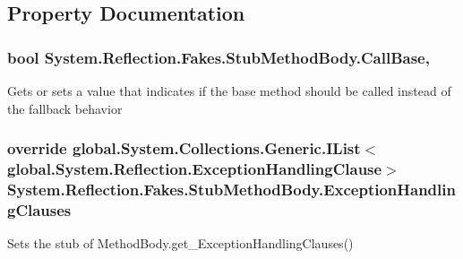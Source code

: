 \subsection{Property Documentation}
\hypertarget{class_system_1_1_reflection_1_1_fakes_1_1_stub_method_body_a09b0a63c100b8145706a73fa740afc9e}{
\subsubsection[{Call\-Base}]{\setlength{\rightskip}{0pt plus 5cm}bool System.\-Reflection.\-Fakes.\-Stub\-Method\-Body.\-Call\-Base\hspace{0.3cm}{\ttfamily [get]}, {\ttfamily [set]}}}\label{class_system_1_1_reflection_1_1_fakes_1_1_stub_method_body_a09b0a63c100b8145706a73fa740afc9e}


Gets or sets a value that indicates if the base method should be called instead of the fallback behavior

\hypertarget{class_system_1_1_reflection_1_1_fakes_1_1_stub_method_body_ac2cdb81048b3b44327038e964fe1f2de}{
\subsubsection[{Exception\-Handling\-Clauses}]{\setlength{\rightskip}{0pt plus 5cm}override global.\-System.\-Collections.\-Generic.\-I\-List$<$global.\-System.\-Reflection.\-Exception\-Handling\-Clause$>$ System.\-Reflection.\-Fakes.\-Stub\-Method\-Body.\-Exception\-Handling\-Clauses\hspace{0.3cm}{\ttfamily [get]}}}\label{class_system_1_1_reflection_1_1_fakes_1_1_stub_method_body_ac2cdb81048b3b44327038e964fe1f2de}


Sets the stub of Method\-Body.\-get\-\_\-\-Exception\-Handling\-Clauses()

